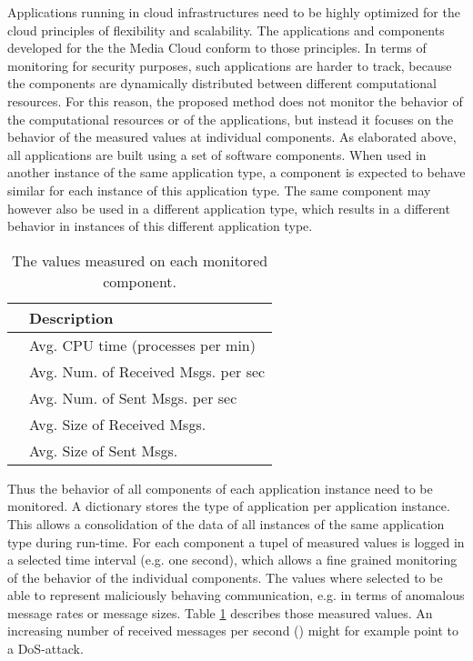 \documentclass{llncs}
\begin{document}
Applications running in cloud infrastructures need to be highly optimized for the cloud principles of flexibility and scalability. The applications and components developed for the the Media Cloud conform to those principles. In terms of monitoring for security purposes, such applications are harder to track, because the components are dynamically distributed between different computational resources. For this reason, the proposed method does not monitor the behavior of the computational resources or of the applications, but instead it focuses on the behavior of the measured values at individual components. As elaborated above, all applications are built using a set of software components. When used in another instance of the same application type, a component is expected to behave similar for each instance of this application type. The same component may however also be used in a different application type, which results in a different behavior in instances of this different application type.

\begin{table}[ht]
\vspace{-4mm}
\centering
\begin{tabular}{ c | l}
\textbf{} & Description \\
\hline
\hline
 & Avg. CPU time (processes per min)\\
\hline
 & Avg. Num. of Received Msgs. per sec\\
\hline
 & Avg. Num. of Sent Msgs. per sec \\
\hline
 & Avg. Size of Received Msgs.\\
\hline
 & Avg. Size of Sent Msgs.\\
\hline
\end{tabular}
\vspace{4mm}
\caption{The values  measured on each monitored component.}
\vspace{-4mm}
\label{tab:componentmeasurements}
\end{table}

Thus the behavior of all components of each application instance need to be monitored. A dictionary stores the type of application per application instance. This allows a consolidation of the data of all instances of the same application type during run-time.
For each component a tupel of measured values  is logged in a selected time interval (e.g. one second), which allows a fine grained monitoring of the behavior of the individual components. The values where selected to be able to represent maliciously behaving communication, e.g. in terms of anomalous message rates or message sizes. Table \ref{tab:componentmeasurements} describes those measured values. An increasing number of received messages per second () might for example point to a DoS-attack.
\end{document}
